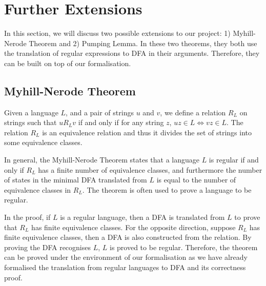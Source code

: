\section{Further Extensions}
\par In this section, we will discuss two possible extensions to
our project: 1) Myhill-Nerode Theorem and 2) Pumping Lemma. In these two
theorems, they both use the translation of regular expressions to DFA
in their arguments. Therefore, they can be built on top of our
formalisation. 


\subsection{Myhill-Nerode Theorem}
\par Given a language \(L\), and a pair of
strings \(u\) and \(v\), we define a relation \(R_L\) on strings such
that \(u R_L v\) if and only if for any string \(z\), \(uz \in L
\Leftrightarrow vz \in L\). The relation \(R_L\) is an equivalence
relation and thus it divides the set of strings into some equivalence
classes.
\par In general, the Myhill-Nerode Theorem states that a language
\(L\) is regular if and only if \(R_L\) has a finite number of
equivalence classes, and furthermore the number of states in the
minimal DFA translated from \(L\) is equal to the number of
equivalence classes in \(R_L\). The theorem is often used to prove a
language to be regular. 

\par In the proof, if \(L\) is a regular language, then a DFA is
translated from \(L\) to prove that \(R_L\) has finite equivalence classes. For the opposite direction, suppose \(R_L\)
has finite equivalence classes, then a DFA is also constructed from
the relation. By proving the DFA recognises \(L\), \(L\) is proved to
be regular. Therefore, the theorem can
be proved under the environment of our formalisation as we have
already formalised the translation from regular languages to DFA and its correctness proof. 


